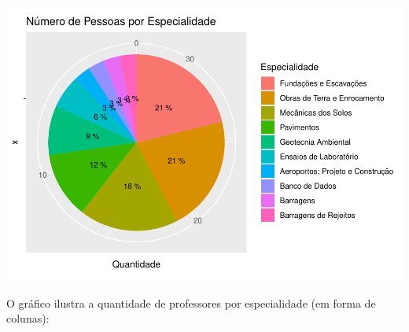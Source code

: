 \documentclass[]{article}
\begin{document}
\includegraphics{LuanFreitas.relatorio2_files/figure-latex/unnamed-chunk-69-1.pdf}

O gráfico ilustra a quantidade de professores por especialidade (em
forma de colunas):
\end{document}
